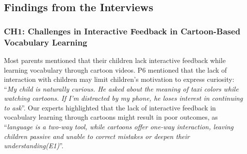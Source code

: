 


\subsection{Findings from the Interviews}
\subsubsection{CH1: Challenges in Interactive Feedback in Cartoon-Based Vocabulary Learning} 
Most parents mentioned that their children lack interactive feedback while learning vocabulary through cartoon videos. P6 mentioned that the lack of interaction with children may limit children's motivation to express curiosity: ``\textit{My child is naturally curious. He asked about the meaning of taxi colors while watching cartoons. If I'm distracted by my phone, he loses interest in continuing to ask}''. Our experts highlighted that the lack of interactive feedback in vocabulary learning through cartoons might result in poor outcomes, as ``\textit{language is a two-way tool, while cartoons offer one-way interaction, leaving children passive and unable to correct mistakes or deepen their understanding(E1)}''.


